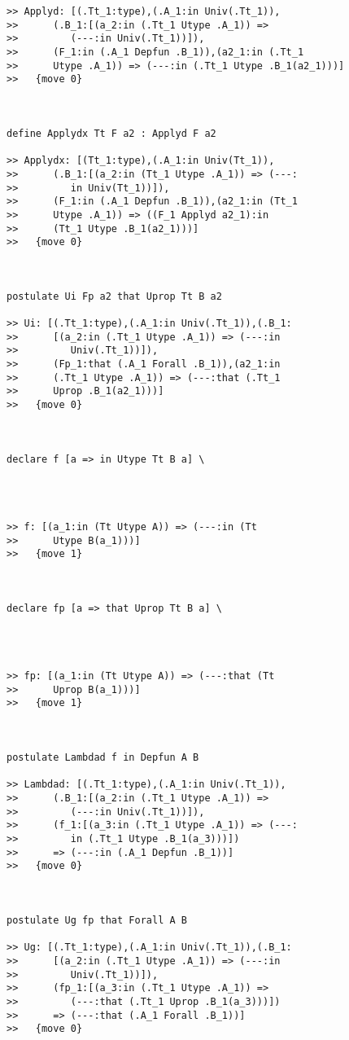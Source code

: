 \documentclass{article}
\begin{document}
\begin{verbatim}
>> Applyd: [(.Tt_1:type),(.A_1:in Univ(.Tt_1)),
>>      (.B_1:[(a_2:in (.Tt_1 Utype .A_1)) =>
>>         (---:in Univ(.Tt_1))]),
>>      (F_1:in (.A_1 Depfun .B_1)),(a2_1:in (.Tt_1
>>      Utype .A_1)) => (---:in (.Tt_1 Utype .B_1(a2_1)))]
>>   {move 0}



define Applydx Tt F a2 : Applyd F a2

>> Applydx: [(Tt_1:type),(.A_1:in Univ(Tt_1)),
>>      (.B_1:[(a_2:in (Tt_1 Utype .A_1)) => (---:
>>         in Univ(Tt_1))]),
>>      (F_1:in (.A_1 Depfun .B_1)),(a2_1:in (Tt_1
>>      Utype .A_1)) => ((F_1 Applyd a2_1):in
>>      (Tt_1 Utype .B_1(a2_1)))]
>>   {move 0}



postulate Ui Fp a2 that Uprop Tt B a2

>> Ui: [(.Tt_1:type),(.A_1:in Univ(.Tt_1)),(.B_1:
>>      [(a_2:in (.Tt_1 Utype .A_1)) => (---:in
>>         Univ(.Tt_1))]),
>>      (Fp_1:that (.A_1 Forall .B_1)),(a2_1:in
>>      (.Tt_1 Utype .A_1)) => (---:that (.Tt_1
>>      Uprop .B_1(a2_1)))]
>>   {move 0}



declare f [a => in Utype Tt B a] \
   



>> f: [(a_1:in (Tt Utype A)) => (---:in (Tt
>>      Utype B(a_1)))]
>>   {move 1}



declare fp [a => that Uprop Tt B a] \
   



>> fp: [(a_1:in (Tt Utype A)) => (---:that (Tt
>>      Uprop B(a_1)))]
>>   {move 1}



postulate Lambdad f in Depfun A B

>> Lambdad: [(.Tt_1:type),(.A_1:in Univ(.Tt_1)),
>>      (.B_1:[(a_2:in (.Tt_1 Utype .A_1)) =>
>>         (---:in Univ(.Tt_1))]),
>>      (f_1:[(a_3:in (.Tt_1 Utype .A_1)) => (---:
>>         in (.Tt_1 Utype .B_1(a_3)))])
>>      => (---:in (.A_1 Depfun .B_1))]
>>   {move 0}



postulate Ug fp that Forall A B

>> Ug: [(.Tt_1:type),(.A_1:in Univ(.Tt_1)),(.B_1:
>>      [(a_2:in (.Tt_1 Utype .A_1)) => (---:in
>>         Univ(.Tt_1))]),
>>      (fp_1:[(a_3:in (.Tt_1 Utype .A_1)) =>
>>         (---:that (.Tt_1 Uprop .B_1(a_3)))])
>>      => (---:that (.A_1 Forall .B_1))]
>>   {move 0}




\end{verbatim}
\end{document}
